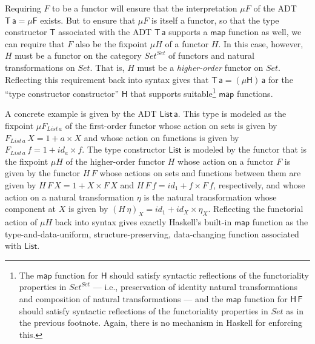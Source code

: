 \documentclass[acmsmall,screen,review,anonymous]{acmart}
\theoremstyle{definition}
\renewcommand{\id}{\mathit{id}}
\begin{document}
Requiring $F$ to be a functor will ensure that the interpretation $\mu
F$ of the ADT $\mathsf{T\,a} = \mathsf{\mu F}$ exists. But to ensure
that $\mu F$ is itself a functor, so that the type constructor
$\mathsf{T}$ associated with the ADT $\mathsf{T\,a}$ supports a
$\mathsf{map}$ function as well, we can require that $F$ also be the
fixpoint $\mu H$ of a functor $H$. In this case, however, $H$ must be
a functor on the category $\mathit{Set}^\mathit{Set}$ of functors and
natural transformations on $\mathit{Set}$. That is, $H$ must be a {\em
  higher-order} functor on $\mathit{Set}$. Reflecting this requirement
back into syntax gives that
$\mathsf{T\,a} = \mathsf{(\mu H)\,a}$
for the ``type constructor constructor''
$\mathsf{H}$ that supports suitable\footnote{The $\mathsf{map}$
  function for $\mathsf{H}$ should satisfy syntactic reflections of
  the functoriality properties in $\mathit{Set}^\mathit{Set}$ ---
  i.e., preservation of identity natural transformations and
  composition of natural transformations --- and the $\mathsf{map}$
  function for $\mathsf{H\,F}$ should satisfy syntactic reflections of
  the functoriality properties in $\mathit{Set}$ as in the previous
  footnote. Again, there is no mechanism in Haskell for enforcing
  this.} $\mathsf{map}$ functions. 

%
       
      
A concrete example is given by the ADT $\mathsf{List\,a}$. This type
is modeled as the fixpoint $\mu F_{\mathit{List\,a}}$ of the
first-order functor whose action on sets is given by
$F_{\mathit{List}\,a}\,X = 1 + a \times X$ and whose action on
functions is given by $F_{\mathit{List}\,a}\,f = 1 + \id_a \times
f$. The type constructor $\mathsf{List}$ is modeled by the functor
that is the fixpoint $\mu H$ of the higher-order functor $H$ whose
action on a functor $F$ is given by the functor $H\,F$ whose actions
on sets and functions between them are given by $H\,F\,X = 1 + X
\times F\,X$ and $H\,F\,f = \id_1 + f \times F\,f$, respectively, and
whose action on a natural transformation $\eta$ is the natural
transformation whose component at $X$ is given by $(H\,\eta)_X = \id_1
+ \id_X \times \eta_X$. Reflecting the functorial action of $\mu H$
back into syntax gives exactly Haskell's built-in $\mathsf{map}$
function as the type-and-data-uniform, structure-preserving,
data-changing function associated with $\mathsf{List}$.
\end{document}
